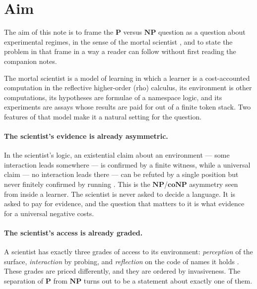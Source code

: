 \documentclass[11pt]{article}
\theoremstyle{definition}
\theoremstyle{plain}
\theoremstyle{remark}
\DeclareRobustCommand{\S}{\ifmmode\mathsection\else$\mathsection$\fi}
\newcommand{\Pclass}{\mathbf{P}}
\newcommand{\NPclass}{\mathbf{NP}}
\newcommand{\coNP}{\mathbf{coNP}}
\begin{document}
\tableofcontents

\section{Aim}\label{sec:intro}

The aim of this note is to frame the $\Pclass$ versus $\NPclass$ question
as a question about experimental regimes, in the sense of the mortal
scientist \cite{Scientist}, and to state the problem in that frame in a
way a reader can follow without first reading the companion notes.

The mortal scientist is a model of learning in which a learner is a
cost-accounted computation in the reflective higher-order (rho) calculus,
its environment is other computations, its hypotheses are formulae of a
namespace logic, and its experiments are assays whose results are paid
for out of a finite token stack. Two features of that model make it a
natural setting for the question.

\paragraph{The scientist's evidence is already asymmetric.} In the
scientist's logic, an existential claim about an environment --- some
interaction leads somewhere --- is confirmed by a finite witness, while a
universal claim --- no interaction leads there --- can be refuted by a
single position but never finitely confirmed by running
\cite[Prop.~Asymmetry]{Scientist}. This is the $\NPclass$/$\coNP$
asymmetry seen from inside a learner. The scientist is never asked to
decide a language. It is asked to pay for evidence, and the question that
matters to it is what evidence for a universal negative costs.

\paragraph{The scientist's access is already graded.} A scientist has
exactly three grades of access to its environment: \emph{perception} of
the surface, \emph{interaction} by probing, and \emph{reflection} on the
code of names it holds \cite[\S2]{Scientist}. These grades are priced
differently, and they are ordered by invasiveness. The separation of
$\Pclass$ from $\NPclass$ turns out to be a statement about exactly one
of them.
\end{document}
